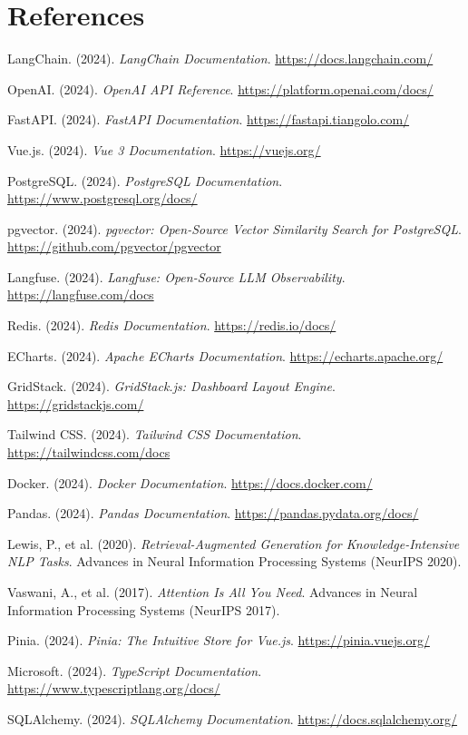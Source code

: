 \documentclass[12pt,a4paper]{report}
\begin{document}
\chapter*{References}

\begin{enumerate}[leftmargin=1.5cm, label={[\arabic*]}]
    \item LangChain. (2024). \textit{LangChain Documentation}. \url{https://docs.langchain.com/}
    \item OpenAI. (2024). \textit{OpenAI API Reference}. \url{https://platform.openai.com/docs/}
    \item FastAPI. (2024). \textit{FastAPI Documentation}. \url{https://fastapi.tiangolo.com/}
    \item Vue.js. (2024). \textit{Vue 3 Documentation}. \url{https://vuejs.org/}
    \item PostgreSQL. (2024). \textit{PostgreSQL Documentation}. \url{https://www.postgresql.org/docs/}
    \item pgvector. (2024). \textit{pgvector: Open-Source Vector Similarity Search for PostgreSQL}. \url{https://github.com/pgvector/pgvector}
    \item Langfuse. (2024). \textit{Langfuse: Open-Source LLM Observability}. \url{https://langfuse.com/docs}
    \item Redis. (2024). \textit{Redis Documentation}. \url{https://redis.io/docs/}
    \item ECharts. (2024). \textit{Apache ECharts Documentation}. \url{https://echarts.apache.org/}
    \item GridStack. (2024). \textit{GridStack.js: Dashboard Layout Engine}. \url{https://gridstackjs.com/}
    \item Tailwind CSS. (2024). \textit{Tailwind CSS Documentation}. \url{https://tailwindcss.com/docs}
    \item Docker. (2024). \textit{Docker Documentation}. \url{https://docs.docker.com/}
    \item Pandas. (2024). \textit{Pandas Documentation}. \url{https://pandas.pydata.org/docs/}
    \item Lewis, P., et al. (2020). \textit{Retrieval-Augmented Generation for Knowledge-Intensive NLP Tasks}. Advances in Neural Information Processing Systems (NeurIPS 2020).
    \item Vaswani, A., et al. (2017). \textit{Attention Is All You Need}. Advances in Neural Information Processing Systems (NeurIPS 2017).
    \item Pinia. (2024). \textit{Pinia: The Intuitive Store for Vue.js}. \url{https://pinia.vuejs.org/}
    \item Microsoft. (2024). \textit{TypeScript Documentation}. \url{https://www.typescriptlang.org/docs/}
    \item SQLAlchemy. (2024). \textit{SQLAlchemy Documentation}. \url{https://docs.sqlalchemy.org/}
\end{enumerate}
\end{document}
